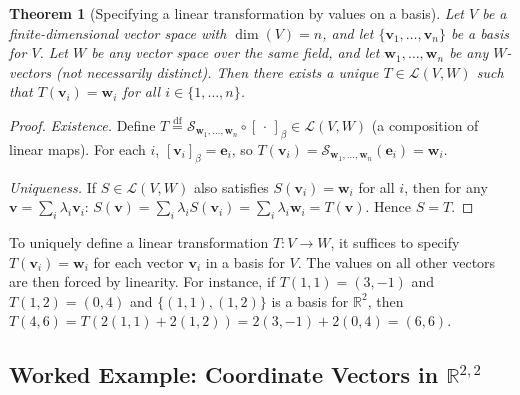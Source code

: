 \documentclass[11pt, a4paper, notitlepage]{report}
\newtheorem{theorem}{Theorem}[section]
\theoremstyle{definition}
\theoremstyle{remark}
\begin{document}
\begin{theorem}[Specifying a linear transformation by values on a basis]\label{thm:lt-basis-values}
Let $V$ be a finite-dimensional vector space with $\dim(V) = n$, and let $\{\mathbf{v}_1, \ldots, \mathbf{v}_n\}$
be a basis for $V$. Let $W$ be any vector space over the same field, and let $\mathbf{w}_1, \ldots, \mathbf{w}_n$
be \emph{any} $W$-vectors (not necessarily distinct). Then there exists a unique $T \in \mathcal{L}(V,W)$
such that $T(\mathbf{v}_i) = \mathbf{w}_i$ for all $i \in \{1,\ldots,n\}$.
\end{theorem}
\begin{proof}
\emph{Existence.} Define $T \stackrel{\mathrm{df}}{=} \mathcal{S}_{\mathbf{w}_1,\ldots,\mathbf{w}_n} \circ [\,\cdot\,]_\beta \in \mathcal{L}(V,W)$
(a composition of linear maps). For each $i$, $[\mathbf{v}_i]_\beta = \mathbf{e}_i$, so
$T(\mathbf{v}_i) = \mathcal{S}_{\mathbf{w}_1,\ldots,\mathbf{w}_n}(\mathbf{e}_i) = \mathbf{w}_i$.

\emph{Uniqueness.} If $S \in \mathcal{L}(V,W)$ also satisfies $S(\mathbf{v}_i) = \mathbf{w}_i$ for all $i$, then
for any $\mathbf{v} = \sum_i \lambda_i \mathbf{v}_i$:
$S(\mathbf{v}) = \sum_i \lambda_i S(\mathbf{v}_i) = \sum_i \lambda_i \mathbf{w}_i = T(\mathbf{v})$.
Hence $S = T$.
\end{proof}

\begin{examtip}[title={Exam Tip: A linear transformation is determined by its values on a basis}]
To uniquely define a linear transformation $T : V \to W$, it suffices to specify $T(\mathbf{v}_i) = \mathbf{w}_i$
for each vector $\mathbf{v}_i$ in a basis for $V$. The values on all other vectors are then forced by linearity.
For instance, if $T(1,1) = (3,-1)$ and $T(1,2) = (0,4)$ and $\{(1,1),(1,2)\}$ is a basis for $\mathbb{R}^2$,
then $T(4,6) = T(2(1,1)+2(1,2)) = 2(3,-1)+2(0,4) = (6,6)$.
\end{examtip}

\subsection{Worked Example: Coordinate Vectors in $\mathbb{R}^{2,2}$}
\end{document}
